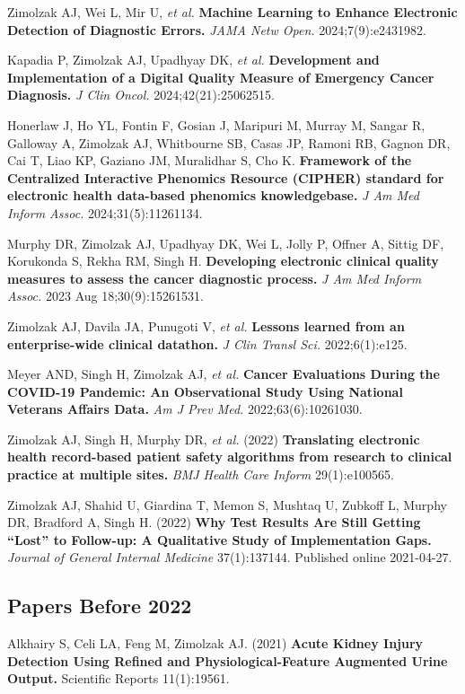 \documentclass[10pt]{article}
\begin{document}
Zimolzak AJ, Wei L, Mir U, \emph{et al.} \textbf{Machine Learning to
  Enhance Electronic Detection of Diagnostic Errors.} \emph{JAMA Netw
Open.} 2024;7(9):e2431982.

Kapadia P, Zimolzak AJ, Upadhyay DK, \emph{et al.} \textbf{Development
  and Implementation of a Digital Quality Measure of Emergency Cancer
  Diagnosis.} \emph{J Clin Oncol.} 2024;42(21):2506\ndash{}2515.

Honerlaw J, Ho YL, Fontin F, Gosian J, Maripuri M, Murray M, Sangar R,
Galloway A, Zimolzak AJ, Whitbourne SB, Casas JP, Ramoni RB, Gagnon
DR, Cai T, Liao KP, Gaziano JM, Muralidhar S, Cho K. \textbf{Framework
  of the Centralized Interactive Phenomics Resource (CIPHER) standard
  for electronic health data-based phenomics knowledgebase.} \emph{J
Am Med Inform Assoc.} 2024;31(5):1126\ndash{}1134.

Murphy DR, Zimolzak AJ, Upadhyay DK, Wei L, Jolly P, Offner A, Sittig
DF, Korukonda S, Rekha RM, Singh H. \textbf{Developing electronic
  clinical quality measures to assess the cancer diagnostic process.}
\emph{J Am Med Inform Assoc.} 2023 Aug 18;30(9):1526\ndash{}1531.

Zimolzak AJ, Davila JA, Punugoti V, \emph{et al.} \textbf{Lessons
  learned from an enterprise-wide clinical datathon.} \emph{J Clin
Transl Sci.} 2022;6(1):e125.

Meyer AND, Singh H, Zimolzak AJ, \emph{et al.} \textbf{Cancer
  Evaluations During the COVID-19 Pandemic: An Observational Study
  Using National Veterans Affairs Data.} \emph{Am J Prev Med.}
2022;63(6):1026\ndash{}1030.

Zimolzak AJ, Singh H, Murphy DR, \emph{et al.} (2022)
\textbf{Translating electronic health record-based patient safety
  algorithms from research to clinical practice at multiple sites.}
\emph{BMJ Health Care Inform} 29(1):e100565.

Zimolzak AJ, Shahid U, Giardina T, Memon S, Mushtaq U, Zubkoff L,
Murphy DR, Bradford A, Singh H. (2022) \textbf{Why Test Results Are
  Still Getting ``Lost'' to Follow-up: A Qualitative Study of
  Implementation Gaps.} \emph{Journal of General Internal Medicine}
37(1):137\ndash{}144. Published online 2021-04-27.

\subsection*{Papers Before 2022}

Alkhairy S, Celi LA, Feng M, Zimolzak AJ. (2021) \textbf{Acute Kidney
  Injury Detection Using Refined and Phys\-i\-o\-log\-i\-cal-Fea\-ture
  Augmented Urine Output.} Scientific Reports 11(1):19561.
\end{document}
